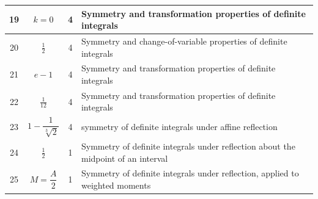 \documentclass[11pt,a4paper]{article}
\begin{document}
\begin{tabularx}{\linewidth}{|c|c|c|X|}
19 & \(k=0\) & 4 & Symmetry and transformation properties of definite integrals \\\hline
20 & $\frac{1}{2}$ & 4 & Symmetry and change-of-variable properties of definite integrals \\\hline
21 & $e-1$ & 4 & Symmetry and transformation properties of definite integrals \\\hline
22 & $\frac{1}{12}$ & 4 & Symmetry and transformation properties of definite integrals \\\hline
23 & $1-\dfrac{1}{\sqrt[3]{2}}$ & 4 & symmetry of definite integrals under affine reflection \\\hline
24 & $\frac{1}{2}$ & 1 & Symmetry of definite integrals under reflection about the midpoint of an interval \\\hline
25 & $M=\dfrac{A}{2}$ & 1 & Symmetry of definite integrals under reflection, applied to weighted moments \\\hline
\end{tabularx}
\end{document}
